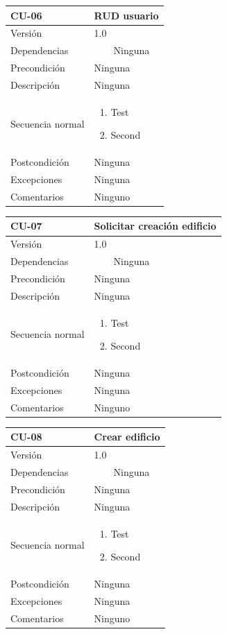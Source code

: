 \documentclass[12pt, a4paper, twoside]{article}
\newcommand{\tabitem}{~~\llap{\textbullet}~~}
\begin{document}
\begin{longtable}{ |l|l| }
  \hline
  CU-06 & RUD usuario \\ \hline
  Versión & 1.0 \\ \hline
  Dependencias & 
    \tabitem Ninguna \\ \hline
  Precondición & Ninguna \\ \hline
  Descripción & Ninguna \\ \hline
  Secuencia normal & 
  \parbox{.45\textwidth}{
    \begin{enumerate}
      \item Test
      \item Second
    \end{enumerate}
  } \\ \hline
  Postcondición & Ninguna \\ \hline
  Excepciones & Ninguna \\ \hline
  Comentarios & Ninguno \\ \hline
\end{longtable}

\begin{longtable}{ |l|l| }
  \hline
  CU-07 & Solicitar creación edificio \\ \hline
  Versión & 1.0 \\ \hline
  Dependencias & 
    \tabitem Ninguna \\ \hline
  Precondición & Ninguna \\ \hline
  Descripción & Ninguna \\ \hline
  Secuencia normal & 
  \parbox{.45\textwidth}{
    \begin{enumerate}
      \item Test
      \item Second
    \end{enumerate}
  } \\ \hline
  Postcondición & Ninguna \\ \hline
  Excepciones & Ninguna \\ \hline
  Comentarios & Ninguno \\ \hline
\end{longtable}

\begin{longtable}{ |l|l| }
  \hline
  CU-08 & Crear edificio \\ \hline
  Versión & 1.0 \\ \hline
  Dependencias & 
    \tabitem Ninguna \\ \hline
  Precondición & Ninguna \\ \hline
  Descripción & Ninguna \\ \hline
  Secuencia normal & 
  \parbox{.45\textwidth}{
    \begin{enumerate}
      \item Test
      \item Second
    \end{enumerate}
  } \\ \hline
  Postcondición & Ninguna \\ \hline
  Excepciones & Ninguna \\ \hline
  Comentarios & Ninguno \\ \hline
\end{longtable}
\end{document}
